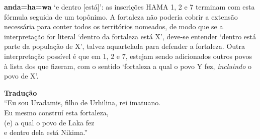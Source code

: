 \noindent\textbf{anda=ha=wa} `e dentro [está]': as inscrições HAMA 1, 2 e 7
terminam com esta fórmula seguida de um topônimo.
A fortaleza não poderia cobrir a extensão necessária para conter todos os
territórios nomeados, de modo que se a interpretação for literal `dentro da
fortaleza está X', deve-se entender `dentro está parte da população de X',
talvez aquartelada para defender a fortaleza.
Outra interpretação possível é que em 1, 2 e 7, estejam sendo adicionados outros
povos à lista dos que fizeram, com o sentido `fortaleza a qual o povo Y fez,
\emph{incluindo} o povo de X'.


\begin{flushleft}
	\noindent \textbf{Tradução}\\
	\noindent [1] ``Eu sou Uradamis, filho de Urhilina, rei imatuano.\\
	\noindent [2] Eu mesmo construí esta fortaleza,\\
	\noindent [3] (e) a qual o povo de Laka fez\\
	\noindent [4] e dentro dela está Nikima.''
\end{flushleft}


